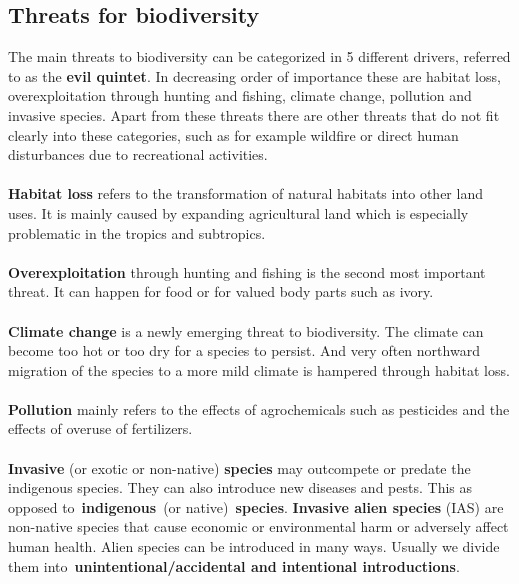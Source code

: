 \documentclass[../summary.tex]{subfiles}
\begin{document}
	
	\subsection{Threats for biodiversity} 
	The main threats to biodiversity can be categorized in 5 different drivers, referred to as the \textbf{evil quintet}. In decreasing order of importance these are habitat loss, overexploitation through hunting and fishing, climate change, pollution and invasive species. Apart from these threats there are other threats that do not fit clearly into these categories, such as for example wildfire or direct human disturbances due to recreational activities.
	\\
	\\
	\textbf{Habitat loss} refers to the transformation of natural habitats into other land uses. It is mainly caused by expanding agricultural land which is especially problematic in the tropics and subtropics.
	\\
	\\
	\textbf{Overexploitation} through hunting and fishing is the second most important threat. It can happen for food or for valued body parts such as ivory.
	\\
	\\
	\textbf{Climate change} is a newly emerging threat to biodiversity. The climate can become too hot or too dry for a species to persist. And very often northward migration of the species to a more mild climate is hampered through habitat loss.
	\\
	\\
	\textbf{Pollution} mainly refers to the effects of agrochemicals such as pesticides and the effects of overuse of fertilizers.
	\\
	\\
	\textbf{Invasive} (or exotic or non-native) \textbf{species} may outcompete or predate the indigenous species. They can also introduce new diseases and pests. This as opposed to \textbf{indigenous} (or native) \textbf{species}.
	\textbf{Invasive alien species} (IAS) are non-native species that cause economic or environmental harm or adversely affect human health.
	Alien species can be introduced in many ways. Usually we divide them into \textbf{unintentional/accidental and intentional introductions}. 
\end{document}
